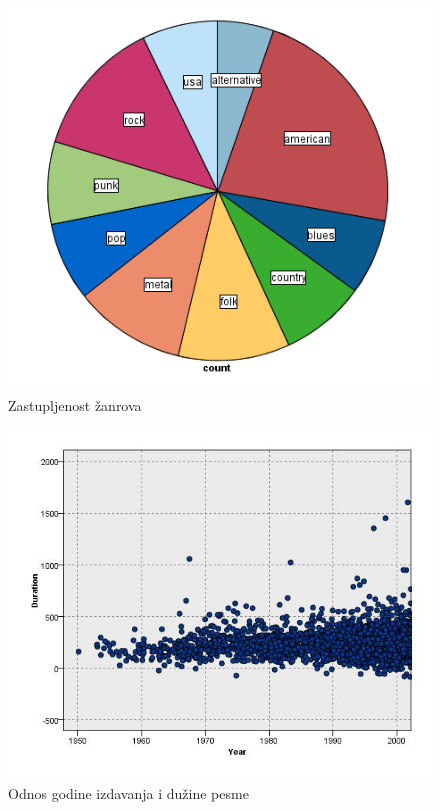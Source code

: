 \begin{figure}[H]
    \centering
    \includegraphics[scale=0.5]{resources/ZastupljenostZanrova.png}
    \caption{Zastupljenost \v{z}anrova}
    \label{fig:ZastupljenostZanrova}
\end{figure}

\begin{figure}[H]
    \centering
    \includegraphics[scale=0.6]{resources/year-duration.jpg}
    \caption{Odnos godine izdavanja i du\v{z}ine pesme}
    \label{fig:YearDuration}
\end{figure}

